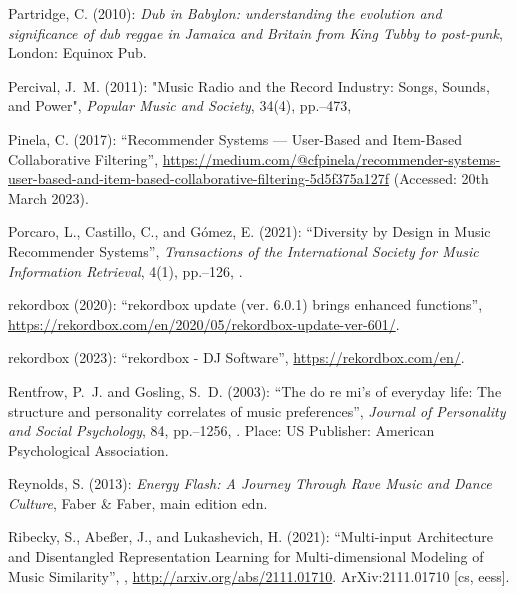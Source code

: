\documentclass[11pt,titlepage,oneside]{book}
\begin{document}
\begin{thebibliography}{97}
	Partridge, C. (2010): \textit{Dub in {Babylon}: understanding the evolution and
		significance of dub reggae in {Jamaica} and {Britain} from {King} {Tubby} to
		post-punk}, London: Equinox Pub.
	
	Percival, J.~M. (2011): "Music {Radio} and the {Record} {Industry}:
		{Songs}, {Sounds}, and {Power}", \textit{Popular Music and Society}, 34(4),
	pp.--473, 
	
	Pinela, C. (2017): \enquote{Recommender {Systems} — {User}-{Based} and
		{Item}-{Based} {Collaborative} {Filtering}},
	\urlprefix\url{https://medium.com/@cfpinela/recommender-systems-user-based-and-item-based-collaborative-filtering-5d5f375a127f} (Accessed: 20th March 2023).
	
	Porcaro, L., Castillo, C., and Gómez, E. (2021): \enquote{Diversity by
		{Design} in {Music} {Recommender} {Systems}}, \textit{Transactions of the
		International Society for Music Information Retrieval}, 4(1),
	pp.--126, .
	
	rekordbox (2020): \enquote{rekordbox update (ver. 6.0.1) brings enhanced
		functions},
	\urlprefix\url{https://rekordbox.com/en/2020/05/rekordbox-update-ver-601/}.
	
	rekordbox (2023): \enquote{rekordbox - {DJ} {Software}},
	\urlprefix\url{https://rekordbox.com/en/}.
	
	Rentfrow, P.~J. and Gosling, S.~D. (2003): \enquote{The do re mi's of everyday
		life: {The} structure and personality correlates of music preferences},
	\textit{Journal of Personality and Social Psychology}, 84, pp.--1256, . Place: US Publisher: American
	Psychological Association.
	
	Reynolds, S. (2013): \textit{Energy {Flash}: {A} {Journey} {Through} {Rave}
		{Music} and {Dance} {Culture}}, Faber \& Faber, main edition edn.
	
	Ribecky, S., Abeßer, J., and Lukashevich, H. (2021): \enquote{Multi-input
		{Architecture} and {Disentangled} {Representation} {Learning} for
		{Multi}-dimensional {Modeling} of {Music} {Similarity}},
	,
	\urlprefix\url{http://arxiv.org/abs/2111.01710}. ArXiv:2111.01710 [cs, eess].
	

\end{thebibliography}
\end{document}
